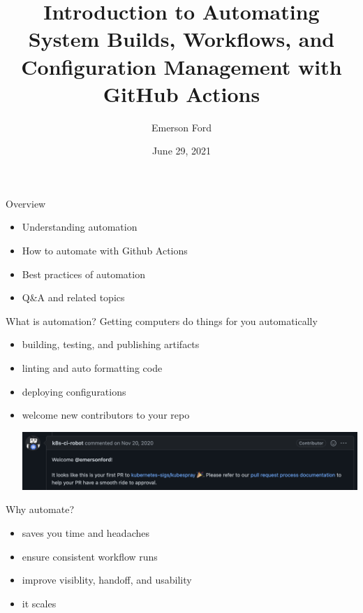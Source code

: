 \documentclass{beamer}
\title{Introduction to Automating System Builds, Workflows, and Configuration Management with GitHub Actions}
\date{June 29, 2021}
\author{Emerson Ford}
\institute{University of Utah --- ITX Meeting}
\begin{document}
\maketitle

\begin{frame}{Overview}
    \begin{itemize}
        \item Understanding automation
        \item How to automate with Github Actions
        \item Best practices of automation
        \item Q\&A and related topics
    \end{itemize}
\end{frame}

\begin{frame}{What is automation?}
    Getting computers do things for you automatically
    \begin{itemize}
        \item building, testing, and publishing artifacts
        \item linting and auto formatting code
        \item deploying configurations
        \item welcome new contributors to your repo \begin{minipage}{\linewidth}\vspace{2pt}\includegraphics[width=0.8\linewidth]{welcome.png}\end{minipage}
    \end{itemize}
\end{frame}

\begin{frame}{Why automate?}
    \begin{itemize}
        \item saves you time and headaches
        \item ensure consistent workflow runs
        \item improve visiblity, handoff, and usability
        \item it scales
    \end{itemize}
\end{frame}
\end{document}
